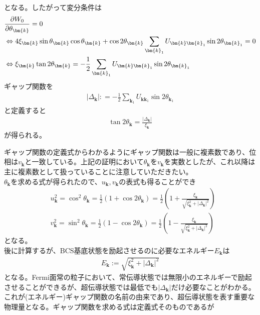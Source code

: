 \documentclass[dvipdfmx, 11pt, a4paper]{jsarticle}
\numberwithin{equation}{section}
\theoremstyle{definition}
\begin{document}
\begin{derivationBox}
\begin{align}
        \end{align}
        となる。したがって変分条件は
        \begin{align}
            &\frac{\partial W_0}{\partial \theta_{\bm{k}}} = 0 \notag \\
            &\Leftrightarrow 4\xi_{\bm{k}} \sin \theta_{\bm{k}} \cos \theta_{\bm{k}}+  \cos 2\theta_{\bm{k}}\sum_{\bm{k}_1} U_{\bm{k}\bm{k}_1}  \sin 2 \theta_{\bm{k}_1} = 0 \notag \\
            &\Leftrightarrow \xi_{\bm{k}} \tan 2\theta_{\bm{k}} = - \frac{1}{2} \sum_{\bm{k}_1} U_{\bm{k}\bm{k}_1}  \sin 2 \theta_{\bm{k}_1}
        \end{align}
        ギャップ関数を
        \begin{align}
            |\Delta_{\bm{k}}| : = - \frac{1}{2} \sum_{\bm{k}_1} U_{\bm{k}\bm{k}_1}  \sin 2 \theta_{\bm{k}_1}
        \end{align}
        と定義すると
        \begin{align}
            \tan 2\theta_{\bm{k}} = \frac{|\Delta_{\bm{k}}|}{\xi_{\bm{k}}}
        \end{align}
        が得られる。
    \end{derivationBox}
    ギャップ関数の定義式からわかるようにギャップ関数は一般に複素数であり、位相は$v_{\bm{k}}$と一致している。上記の証明において$\theta_{\bm{k}}$を$v_{\bm{k}}$を実数としたが、これ以降は主に複素数として扱っていることに注意していただきたい。\\
    $\theta_{\bm{k}}$を求める式が得られたので、$u_{\bm{k}},v_{\bm{k}}$の表式も得ることができ
    \begin{align}
        &u_{\bm{k}}^2 = \cos^2 \theta_{\bm{k}} = \frac{1}{2} (1 + \cos 2\theta_{\bm{k}}) = \frac{1}{2} \left( 1 + \frac{\xi_{\bm{k}}}{\sqrt{\xi_{\bm{k}}^2 + |\Delta_{\bm{k}}|^2}} \right)  \\
        &v_{\bm{k}}^2 = \sin^2 \theta_{\bm{k}} = \frac{1}{2} (1 - \cos 2\theta_{\bm{k}}) = \frac{1}{2} \left( 1 - \frac{\xi_{\bm{k}}}{\sqrt{\xi_{\bm{k}}^2 + |\Delta_{\bm{k}}|^2}} \right)
    \end{align}
    となる。\\
    後に計算するが、BCS基底状態を励起させるのに必要なエネルギー$E_{\bm{k}}$は
    \begin{align}
        E_{\bm{k}} := \sqrt{\xi_{\bm{k}}^2+|\Delta_{\bm{k}}|^2}
    \end{align}
    となる。Fermi面常の粒子において、常伝導状態では無限小のエネルギーで励起させることができるが、超伝導状態では最低でも$|\Delta_{\bm{k}}|$だけ必要なことがわかる。これが(エネルギー)ギャップ関数の名前の由来であり、超伝導状態を表す重要な物理量となる。ギャップ関数を求める式は定義式そのものであるが
\end{document}
